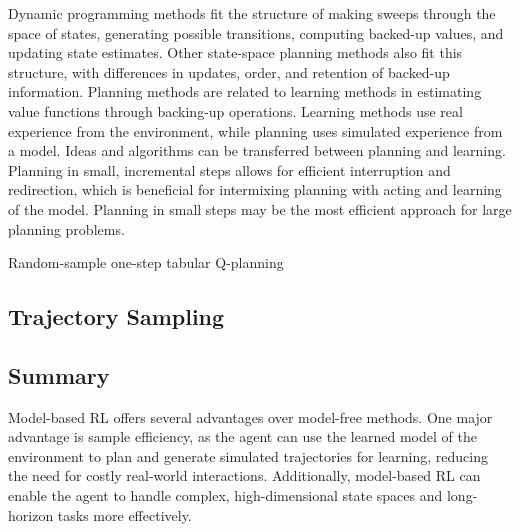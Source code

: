 \documentclass[../chapters.tex]{subfiles}
\begin{document}
    Dynamic programming methods fit the structure of making sweeps through the space of states, generating possible transitions, computing backed-up values, and updating state estimates.
    Other state-space planning methods also fit this structure, with differences in updates, order, and retention of backed-up information.
    Planning methods are related to learning methods in estimating value functions through backing-up operations.
    Learning methods use real experience from the environment, while planning uses simulated experience from a model.
    Ideas and algorithms can be transferred between planning and learning.
    Planning in small, incremental steps allows for efficient interruption and redirection, which is beneficial for intermixing planning with acting and learning of the model.
    Planning in small steps may be the most efficient approach for large planning problems.
    \newline
    \newline
    \begin{algorithm}[H]
        \SetAlgoLined
        \caption{Random-sample one-step tabular Q-planning}
    \end{algorithm}

    \subsection{Trajectory Sampling}

    \subsection{Summary}

    Model-based RL offers several advantages over model-free methods.
    One major advantage is sample efficiency, as the agent can use the learned model of the environment to plan and generate simulated trajectories for learning, reducing the need for costly real-world interactions.
    Additionally, model-based RL can enable the agent to handle complex, high-dimensional state spaces and long-horizon tasks more effectively.
\end{document}
